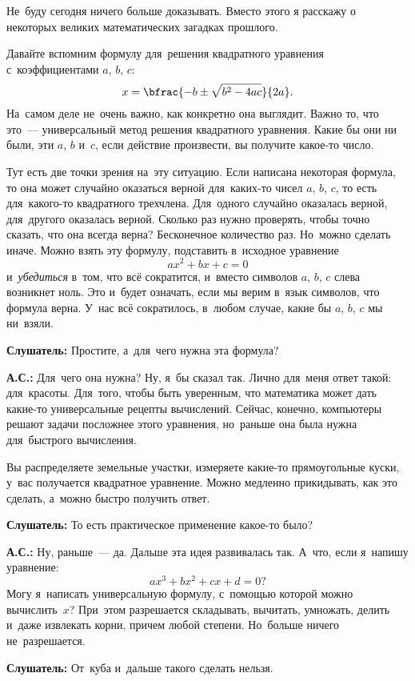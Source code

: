 Не~буду сегодня ничего больше доказывать. Вместо этого я расскажу о некоторых великих математических загадках прошлого.

Давайте вспомним формулу для~решения квадратного уравнения с~коэффициентами $a$, $b$, $c$:
$$
x=\bfrac{-b\pm \sqrt{b^{2}-4ac}}{2a}.
$$
На~самом деле не~очень важно, как конкретно она выглядит. Важно то, что это~--- универсальный метод
решения квадратного уравнения. Какие бы они ни были, эти $a$, $b$ и~$c$, если действие произвести, вы
получите какое-то число.

Тут есть две точки зрения на~эту ситуацию. Если
написана некоторая формула, то она может случайно оказаться верной для~каких-то чисел $a$, $b$,
$c$, то есть для~какого-то квадратного трехчлена. Для~одного случайно оказалась верной, для~другого
оказалась верной.
Сколько раз нужно проверять, чтобы точно сказать, что она всегда верна?
Бесконечное количество раз. Но~можно сделать иначе. Можно взять эту формулу, подставить в~исходное
уравнение
$$
ax^{2}+bx+c=0
$$
и~\textit{убедиться} в~том, что всё сократится, и~вместо символов $a$, $b$, $c$ слева
возникнет ноль. Это и~будет означать, если мы верим в~язык символов, что формула верна. У~нас всё
сократилось, в~любом случае, какие бы $a$, $b$, $c$ мы ни~взяли.


\textbf{Слушатель:} Простите, а~для~чего нужна эта формула?

\textbf{А.С.:} Для~чего она нужна? Ну, я~бы сказал так. Лично для~меня ответ такой: для~красоты.
Для~того, чтобы быть уверенным, что математика может дать какие-то универсальные рецепты вычислений. Сейчас, конечно,
компьютеры решают задачи посложнее этого уравнения, но~раньше она была нужна для~быстрого
вычисления.

Вы распределяете земельные участки, измеряете какие-то прямоугольные куски, у~вас получается
квадратное уравнение. Можно медленно прикидывать, как это сделать, а~можно быстро получить ответ.

\textbf{Слушатель:} То есть практическое применение какое-то было?

\textbf{А.С.:} Ну, раньше~--- да. Дальше эта идея развивалась так. А~что, если я~напишу уравнение:
$$
ax^{3}+bx^{2}+cx+d=0?
$$
Могу я~написать универсальную формулу, с~помощью которой можно вычислить~$x$? При~этом разрешается
складывать, вычитать, умножать, делить и~даже извлекать корни, причем любой степени. Но~больше
ничего не~разрешается.

\textbf{Слушатель:} От~куба и~дальше такого сделать нельзя.

